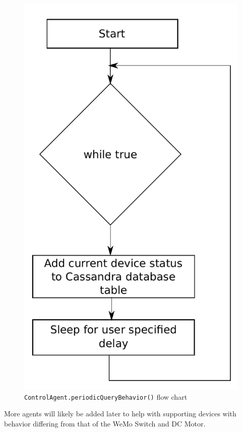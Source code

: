\documentclass[letterpaper,12pt]{article}   %
\begin{document}
\begin{figure}[H]
    \centering
    \includegraphics[scale=0.45]{figs/periodicQueryBehaviorFlow.pdf}
    \caption{\texttt{ControlAgent.periodicQueryBehavior()} flow chart}
    \label{fig:periodicQueryBehavior}
\end{figure}

More agents will likely be added later to help with supporting devices with behavior differing from that of the WeMo Switch and DC Motor. 
\end{document}
